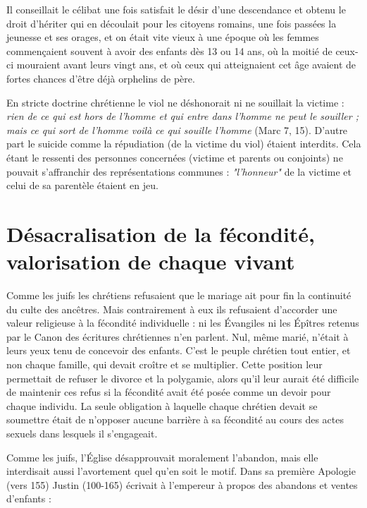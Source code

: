  Il conseillait le célibat une fois satisfait le désir d'une descendance et obtenu le droit d'hériter qui en découlait pour les citoyens romains, une fois passées la jeunesse et ses orages, et on était vite vieux à une époque où les femmes commençaient souvent à avoir des enfants dès 13 ou 14 ans, où la moitié de ceux-ci mouraient avant leurs vingt ans, et où ceux qui atteignaient cet âge avaient de fortes chances d'être déjà orphelins de père. 
 
 En stricte doctrine chrétienne le viol ne déshonorait ni ne souillait la victime : \emph{rien de ce qui est hors de l'homme et qui entre dans l'homme ne peut le souiller ; mais ce qui sort de l'homme voilà ce qui souille l'homme} (Marc 7, 15).  D'autre part le suicide comme la répudiation (de la victime du viol) étaient interdits. Cela étant le ressenti des personnes concernées (victime et parents ou conjoints) ne pouvait s'affranchir des représentations communes : \emph{"l'honneur"} de la victime et celui de sa parentèle étaient en jeu. 


\section{Désacralisation de la fécondité, valorisation de chaque vivant}

 Comme les juifs les chrétiens refusaient que le mariage ait pour fin la continuité du culte des ancêtres. Mais contrairement à eux ils refusaient d'accorder une valeur religieuse à la fécondité individuelle : ni les Évangiles ni les Épîtres retenus par le Canon des écritures chrétiennes n'en parlent. Nul, même marié, n'était à leurs yeux tenu de concevoir des enfants. C'est le peuple chrétien tout entier, et non chaque famille, qui devait croître et se multiplier. Cette position leur permettait de refuser le divorce et la polygamie, alors qu'il leur aurait été difficile de maintenir ces refus si la fécondité avait été posée comme un devoir pour chaque individu. La seule obligation à laquelle chaque chrétien devait se soumettre était de n'opposer aucune barrière à sa fécondité au cours des actes sexuels dans lesquels il s'engageait. 

 Comme les juifs, l'Église désapprouvait moralement l'abandon, mais elle interdisait aussi l'avortement quel qu'en soit le motif. Dans sa première Apologie (vers 155) Justin (100-165) écrivait à l'empereur à propos des abandons et ventes d'enfants :

